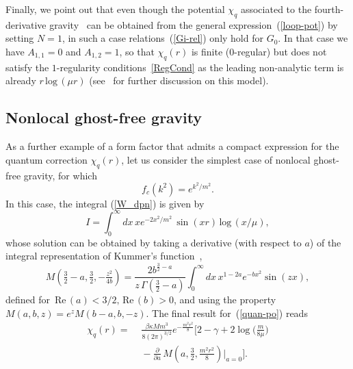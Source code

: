 \documentclass[aps,prd,a4paper,twocolumn,showpacs,showkeys,preprintnumbers,amsmath,amssymb,nofootinbib]{revtex4-2}
\numberwithin{equation}{section}
\def\beq{\begin{equation}}
\def\eeq{\end{equation}}
\def\ln{\,\mbox{log}\,}
\renewcommand{\Re}{\,\mbox{Re}\,}
\newcommand{\eq}[1]{(\ref{#1})}
\def\Ga{\Gamma}
\begin{document}
Finally, we point out that even though the potential $\chi_q$ associated to the fourth-derivative gravity~\cite{Nos4der} can be obtained from the general expression~\eq{loop-pot} by setting $N=1$, in such a case relations~\eq{Gi-rel} only hold for $G_0$. In that case
we have $A_{1,1} = 0$ and $A_{1,2} = 1$, so that $\chi_q(r)$ is finite (0-regular) but does not satisfy the $1$-regularity conditions~\eqref{RegCond} as the leading non-analytic term is already $r\ln (\mu r)$ (see~\cite{Nos4der} for further discussion on this model).



\subsection{Nonlocal ghost-free gravity}
\label{pert_B}

As a further example of a form factor that admits a compact expression for the quantum correction $\chi_q (r)$, let us
consider the simplest case of nonlocal ghost-free gravity, for which 
\beq
f_c (k^2) = e^{k^2/m^2}. 
\eeq
In this case, the integral \eq{W_dpn} is given by 
\beq \label{W_gf}
I = \int_0^\infty dx  \,x e^{-2x^2/m^2} \, \sin (xr) \ln(x/\mu),
\eeq
whose solution can be obtained by taking a derivative (with respect to $a$) of the integral representation of Kummer's function~\cite{Grad,NIST},
%
$$
M \left(  \tfrac{3}{2} -a, \tfrac{3}{2},-\tfrac{z^2}{4b} \right)  =   \frac{2 b^{\tfrac32 - a}}{z \, \Ga \left(\tfrac32 -a\right)} \int_0^\infty dx \, 
 x^{1 - 2a} e^{-bx^2} \sin (z x)
,
$$
defined for $\Re (a) < 3/2, \Re(b) >0$, and using the property 
$
M(a,b,z) = e^z M(b-a,b,-z)
$.
The final result for~\eq{quan-po} reads
%
\begin{equation}
\begin{split} \label{Chi1Exp}
\chi_q(r) = & \,\, \frac{\beta \kappa M m^3}{8 (2 \pi)^{3/2}} e^{-\frac{m^2r^2}{8}} \bigg[ 2 - \gamma +  2\log \bigg( \frac{m}{8 \mu} \bigg) 
\\
& \,\, - \frac{\partial}{\partial a} \, M\left(a,\tfrac{3}{2},\tfrac{m^2 r^2}{8}\right) \Big\vert_{a=0} \bigg].
\end{split}
\end{equation}
\end{document}
